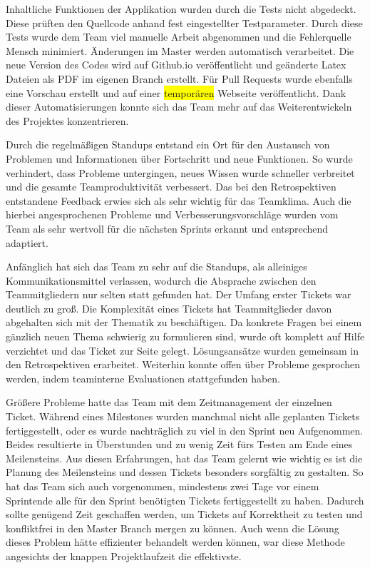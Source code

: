 \documentclass[10pt, a4paper]{article}
\begin{document}
\begin{onehalfspace}
Inhaltliche Funktionen der Applikation wurden durch die Tests nicht abgedeckt.
Diese prüften den Quellcode anhand fest eingestellter Testparameter.
Durch diese Tests wurde dem Team viel manuelle Arbeit abgenommen und die Fehlerquelle Mensch minimiert.
Änderungen im Master werden automatisch verarbeitet. Die neue Version des Codes wird auf Github.io veröffentlicht und geänderte Latex Dateien als PDF im eigenen Branch erstellt.
Für Pull Requests wurde ebenfalls eine Vorschau erstellt und auf einer \colorbox{yellow}{temporären} Webseite veröffentlicht.
Dank dieser Automatisierungen konnte sich das Team mehr auf das Weiterentwickeln des Projektes konzentrieren.

Durch die regelmäßigen Standups entstand ein Ort für den Austausch von Problemen und Informationen über Fortschritt und neue Funktionen.
So wurde verhindert, dass Probleme untergingen, neues Wissen wurde schneller verbreitet und die gesamte Teamproduktivität verbessert.
Das bei den Retrospektiven entstandene Feedback erwies sich als sehr wichtig für das Teamklima.
Auch die hierbei angesprochenen Probleme und Verbesserungsvorschläge wurden vom Team als sehr wertvoll für die nächsten Sprints erkannt und entsprechend adaptiert.

Anfänglich hat sich das Team zu sehr auf die Standups, als alleiniges Kommunikationsmittel verlassen, wodurch die Absprache zwischen den Teammitgliedern nur selten statt gefunden hat.
Der Umfang erster Tickets war deutlich zu groß.
Die Komplexität eines Tickets hat Teammitglieder davon abgehalten sich mit der Thematik zu beschäftigen.
Da konkrete Fragen bei einem gänzlich neuen Thema schwierig zu formulieren sind, wurde oft komplett auf Hilfe verzichtet und das Ticket zur Seite gelegt.
Lösungsansätze wurden gemeinsam in den Retrospektiven erarbeitet.
Weiterhin konnte offen über Probleme gesprochen werden, indem teaminterne Evaluationen stattgefunden haben.

Größere Probleme hatte das Team mit dem Zeitmanagement der einzelnen Ticket.
Während eines Milestones wurden manchmal nicht alle geplanten Tickets fertiggestellt, oder es wurde nachträglich zu viel in den Sprint neu Aufgenommen.
Beides resultierte in Überstunden und zu wenig Zeit fürs Testen am Ende eines Meilensteins.
Aus diesen Erfahrungen, hat das Team gelernt wie wichtig es ist die Planung des Meilensteins und dessen Tickets besonders sorgfältig zu gestalten.
So hat das Team sich auch vorgenommen, mindestens zwei Tage vor einem Sprintende alle für den Sprint benötigten Tickets fertiggestellt zu haben.
Dadurch sollte genügend Zeit geschaffen werden, um Tickets auf Korrektheit zu testen und konfliktfrei in den Master Branch mergen zu können.
Auch wenn die Lösung dieses Problem hätte effizienter behandelt werden können, war diese Methode angesichts der knappen Projektlaufzeit die effektivste.



\end{onehalfspace}
\end{document}
